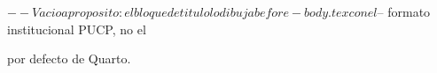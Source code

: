 $-- Vacio a proposito: el bloque de titulo lo dibuja before-body.tex con el
$-- formato institucional PUCP, no el \maketitle por defecto de Quarto.
